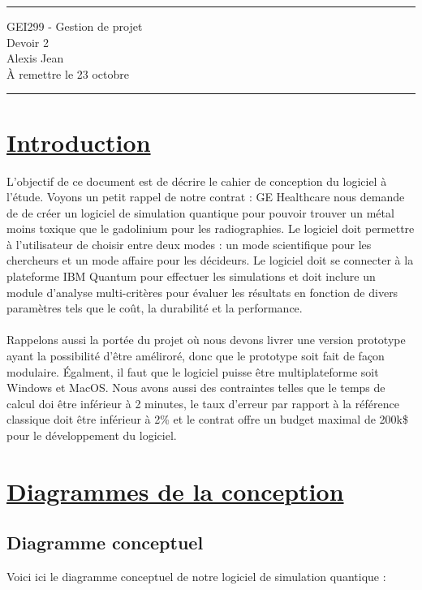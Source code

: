 \documentclass[11pt]{article}
\begin{document}
\hrule

\begin{center}
  {\Large GEI299 - Gestion de projet} \\ \vspace{5mm}
  {\LARGE\sffamily Devoir 2} \\
  Alexis Jean \\
  À remettre le 23 octobre
\end{center}

\hrule


\section{\underline{Introduction}}
L'objectif de ce document est de décrire le cahier de conception du logiciel à l'étude. Voyons un petit rappel de notre contrat : GE Healthcare nous demande de de créer un logiciel de simulation quantique pour pouvoir trouver un métal moins toxique que le gadolinium pour les radiographies. Le logiciel doit permettre à l'utilisateur de choisir entre deux modes : un mode scientifique pour les chercheurs et un mode affaire pour les décideurs. Le logiciel doit se connecter à la plateforme IBM Quantum pour effectuer les simulations et doit inclure un module d'analyse multi-critères pour évaluer les résultats en fonction de divers paramètres tels que le coût, la durabilité et la performance.
\paragraph{}
Rappelons aussi la portée du projet où nous devons livrer une version prototype ayant la possibilité d'être améliroré, donc que le prototype soit fait de façon modulaire. Égalment, il faut que le logiciel puisse être multiplateforme soit Windows et MacOS. Nous avons aussi des contraintes telles que le temps de calcul doi être inférieur à 2 minutes, le taux d'erreur par rapport à la référence classique doit être inférieur à 2\% et le contrat offre un budget maximal de 200k\$ pour le développement du logiciel.

\section{\underline{Diagrammes de la conception}}

\subsection{Diagramme conceptuel}
Voici ici le diagramme conceptuel de notre logiciel de simulation quantique :
\end{document}
